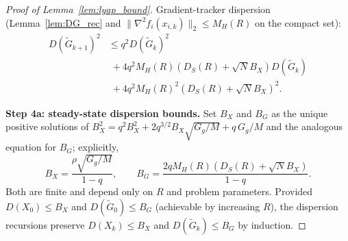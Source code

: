 \documentclass[review,onefignum,onetabnum]{siamart171218}
\begin{document}
\begin{proof}[Proof of Lemma~\ref{lem:lyap_bound}]
		Gradient-tracker dispersion (Lemma~\ref{lem:DG_rec}
		and $\|\nabla^2 f_i(x_{i,k})\|_2\le M_H(R)$ on the compact set):
		\begin{align*}
			D(\tilde G_{k+1})^2
			&\le q^2 D(\tilde G_k)^2\\
			&\;+ 4q^2 M_H(R)(D_S(R){+}\sqrt{N}B_X)D(\tilde G_k)\\
			&\;+ 4q^2 M_H(R)^2(D_S(R){+}\sqrt{N}B_X)^2.
		\end{align*}
		
		\noindent\textbf{Step 4a: steady-state dispersion bounds.}
		Set $B_X$ and $B_G$ as the unique positive solutions of
		$B_X^2 = q^2 B_X^2 + 2q^{3/2}B_X\sqrt{G_g/M}+q\,G_g/M$
		and the analogous equation for $B_G$; explicitly,
		\begin{equation}\label{eq:disp_fp}
			B_X
			= \frac{\rho\sqrt{G_g/M}}{1-q},
			\qquad
			B_G
			= \frac{2qM_H(R)(D_S(R)+\sqrt{N}B_X)}{1-q}.
		\end{equation}
		Both are finite and depend only on $R$ and problem parameters.
		Provided $D(X_0)\le B_X$ and $D(\tilde G_0)\le B_G$
		(achievable by increasing $R$), the dispersion recursions
		preserve $D(X_k)\le B_X$ and $D(\tilde G_k)\le B_G$ by induction.
		

\end{proof}
\end{document}
